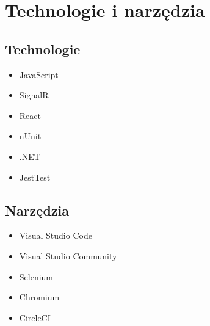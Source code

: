 \documentclass[12pt]{report}
\begin{document}
	\chapter{Technologie i narzędzia}	
		\section{Technologie}
		\begin{itemize}
			\item JavaScript
			\item SignalR
			\item React
			\item nUnit
			\item .NET
			\item JestTest
		\end{itemize}
		
		\section{Narzędzia}
		\begin{itemize}
			\item Visual Studio Code
			\item Visual Studio Community
			\item Selenium
			\item Chromium
			\item CircleCI
		\end{itemize}
	
\end{document}
